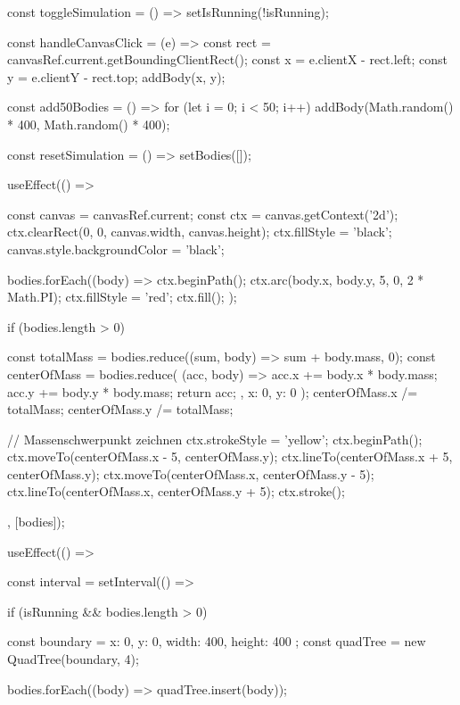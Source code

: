 \documentclass[a4paper,12pt,twoside]{article}
\begin{document}
\begin{javascript}
{    const toggleSimulation = () => {
        setIsRunning(!isRunning);
    }

    const handleCanvasClick = (e) => {
        const rect = canvasRef.current.getBoundingClientRect();
        const x = e.clientX - rect.left;
        const y = e.clientY - rect.top;
        addBody(x, y);
    }

    const add50Bodies = () => {
        for (let i = 0; i < 50; i++) {
            addBody(Math.random() * 400, Math.random() * 400);
        }
    }

    const resetSimulation = () => {
        setBodies([]);
    }

    useEffect(() => {
        const canvas = canvasRef.current;
        const ctx = canvas.getContext('2d');
        ctx.clearRect(0, 0, canvas.width, canvas.height);
        ctx.fillStyle = 'black';
        canvas.style.backgroundColor = 'black';

        bodies.forEach((body) => {
            ctx.beginPath();
            ctx.arc(body.x, body.y, 5, 0, 2 * Math.PI);
            ctx.fillStyle = 'red';
            ctx.fill();
        });

        if (bodies.length > 0) {
            const totalMass = bodies.reduce((sum, body) => sum + body.mass, 0);
            const centerOfMass = bodies.reduce(
                (acc, body) => {
                    acc.x += body.x * body.mass;
                    acc.y += body.y * body.mass;
                    return acc;
                },
                { x: 0, y: 0 }
            );
            centerOfMass.x /= totalMass;
            centerOfMass.y /= totalMass;

            // Massenschwerpunkt zeichnen
            ctx.strokeStyle = 'yellow';
            ctx.beginPath();
            ctx.moveTo(centerOfMass.x - 5, centerOfMass.y);
            ctx.lineTo(centerOfMass.x + 5, centerOfMass.y);
            ctx.moveTo(centerOfMass.x, centerOfMass.y - 5);
            ctx.lineTo(centerOfMass.x, centerOfMass.y + 5);
            ctx.stroke();
        }

    }, [bodies]);

    useEffect(() => {
        const interval = setInterval(() => {
            if (isRunning && bodies.length > 0) {

                const boundary = { x: 0, y: 0, width: 400, height: 400 };
                const quadTree = new QuadTree(boundary, 4);

                bodies.forEach((body) => quadTree.insert(body));

}}}}
\end{javascript}
\end{document}
